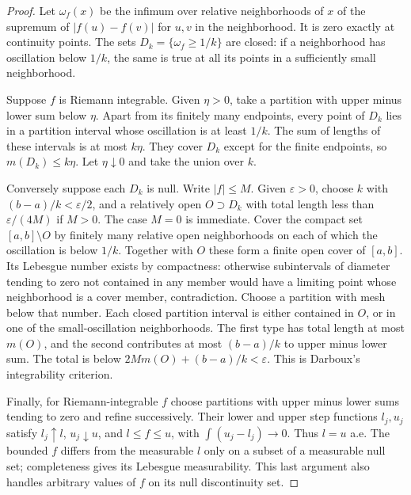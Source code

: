 \documentclass[11pt,oneside,openany]{book}
\theoremstyle{definition}
\theoremstyle{remark}
\newcommand{\eps}{\varepsilon}\newcommand{\ee}{\varepsilon}
\begin{document}
\begin{proof}
Let $\omega_f(x)$ be the infimum over relative neighborhoods of $x$ of
the supremum of $|f(u)-f(v)|$ for $u,v$ in the neighborhood. It is zero
exactly at continuity points. The sets $D_k=\{\omega_f\geq1/k\}$ are
closed: if a neighborhood has oscillation below $1/k$, the same is true
at all its points in a sufficiently small neighborhood.

Suppose $f$ is Riemann integrable. Given $\eta>0$, take a partition with
upper minus lower sum below $\eta$. Apart from its finitely many endpoints,
every point of $D_k$ lies in a partition interval whose oscillation is
at least $1/k$. The sum of lengths of these intervals is at most $k\eta$.
They cover $D_k$ except for the finite endpoints, so $m(D_k)\leq k\eta$.
Let $\eta\downarrow0$ and take the union over $k$.

Conversely suppose each $D_k$ is null. Write $|f|\leq M$. Given
$\eps>0$, choose $k$ with $(b-a)/k<\eps/2$, and a relatively open
$O\supset D_k$ with total length less than $\eps/(4M)$ if $M>0$.
The case $M=0$ is immediate. Cover the compact set $[a,b]\setminus O$
by finitely many relative open neighborhoods on each of which the
oscillation is below $1/k$. Together with $O$ these form a finite open
cover of $[a,b]$. Its Lebesgue number exists by compactness: otherwise
subintervals of diameter tending to zero not contained in any member
would have a limiting point whose neighborhood is a cover member,
contradiction. Choose a partition with mesh below that number. Each
closed partition interval is either contained in $O$, or in one of the
small-oscillation neighborhoods. The first type has total length at most
$m(O)$, and the second contributes at most $(b-a)/k$ to upper minus
lower sum. The total is below $2M m(O)+(b-a)/k<\eps$.
This is Darboux's integrability criterion.

Finally, for Riemann-integrable $f$ choose partitions with upper minus
lower sums tending to zero and refine successively. Their lower and upper
step functions $l_j,u_j$ satisfy $l_j\uparrow l$, $u_j\downarrow u$,
and $l\leq f\leq u$, with $\int(u_j-l_j)\to0$.
Thus $l=u$ a.e. The bounded $f$ differs from the measurable $l$ only
on a subset of a measurable null set; completeness gives its Lebesgue
measurability. This last argument also handles arbitrary values of $f$
on its null discontinuity set.
\end{proof}
\end{document}
